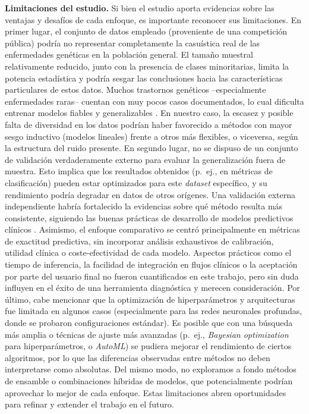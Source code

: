\documentclass[11pt,a4paper,spanish]{book}
\numberwithin{equation}{chapter}
\numberwithin{figure}{chapter}
\begin{document}
\noindent \textbf{Limitaciones del estudio.} Si bien el estudio aporta evidencias sobre las ventajas y desafíos de cada enfoque, es importante reconocer sus limitaciones. En primer lugar, el conjunto de datos empleado (proveniente de una competición pública) podría no representar completamente la casuística real de las enfermedades genéticas en la población general. El tamaño muestral relativamente reducido, junto con la presencia de clases minoritarias, limita la potencia estadística y podría sesgar las conclusiones hacia las características particulares de estos datos. Muchos trastornos genéticos –especialmente enfermedades raras– cuentan con muy pocos casos documentados, lo cual dificulta entrenar modelos fiables y generalizables \cite{Libbrecht2015,Ching_2018}. En nuestro caso, la escasez y posible falta de diversidad en los datos podrían haber favorecido a métodos con mayor sesgo inductivo (modelos lineales) frente a otros más flexibles, o viceversa, según la estructura del ruido presente. En segundo lugar, no se dispuso de un conjunto de validación verdaderamente externo para evaluar la generalización fuera de muestra. Esto implica que los resultados obtenidos (p.~ej., en métricas de clasificación) pueden estar optimizados para este \textit{dataset} específico, y su rendimiento podría degradar en datos de otros orígenes. Una validación externa independiente habría fortalecido la evidencias sobre qué método resulta más consistente, siguiendo las buenas prácticas de desarrollo de modelos predictivos clínicos \cite{10.1093/eurheartj/ehu207}. Asimismo, el enfoque comparativo se centró principalmente en métricas de exactitud predictiva, sin incorporar análisis exhaustivos de calibración, utilidad clínica o coste-efectividad de cada modelo. Aspectos prácticos como el tiempo de inferencia, la facilidad de integración en flujos clínicos o la aceptación por parte del usuario final no fueron cuantificados en este trabajo, pero sin duda influyen en el éxito de una herramienta diagnóstica y merecen consideración. Por último, cabe mencionar que la optimización de hiperparámetros y arquitecturas fue limitada en algunos casos (especialmente para las redes neuronales profundas, donde se probaron configuraciones estándar). Es posible que con una búsqueda más amplia o técnicas de ajuste más avanzadas (p.~ej., \textit{Bayesian optimization} para hiperparámetros, o \textit{AutoML}) se pudiera mejorar el rendimiento de ciertos algoritmos, por lo que las diferencias observadas entre métodos no deben interpretarse como absolutas. Del mismo modo, no exploramos a fondo métodos de ensamble o combinaciones híbridas de modelos, que potencialmente podrían aprovechar lo mejor de cada enfoque. Estas limitaciones abren oportunidades para refinar y extender el trabajo en el futuro.
\end{document}
